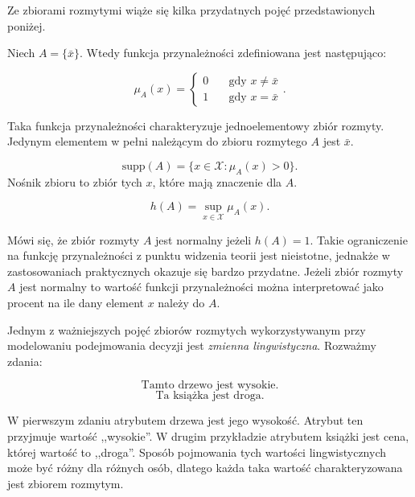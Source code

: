 Ze zbiorami rozmytymi wiąże się kilka przydatnych pojęć przedstawionych poniżej.

\begin{definition}[Singleton]
Niech $A = \{ \bar{x} \}$. Wtedy funkcja przynależności zdefiniowana jest
następująco:

\begin{equation}
\mu_A(x) = 
\left\{ 
	\begin{array}{ll}
	  0 & \quad \textrm{gdy } x \neq \bar{x} \\
      1 & \quad \textrm{gdy } x = \bar{x}
  	\end{array} 
  \right..
\end{equation}

Taka funkcja przynależności charakteryzuje jednoelementowy zbiór rozmyty.
Jedynym elementem w pełni należącym do zbioru rozmytego $A$ jest $\bar{x}$.
\end{definition}

\begin{definition}
\begin{equation}
  \mathrm{supp}(A) = \{ x \in \mathcal{X} : \mu_A(x) > 0 \}.
\end{equation}
Nośnik zbioru to zbiór tych $x$, które mają znaczenie dla $A$.  
\end{definition}

\begin{definition}
\begin{equation}
  h(A) = \sup_{x \in \mathcal{X}} \mu_A(x).
\end{equation}
\end{definition}

Mówi się, że zbiór rozmyty $A$ jest normalny jeżeli $h(A)=1$. Takie ograniczenie
na funkcję przynależności z punktu widzenia teorii jest nieistotne, jednakże w
zastosowaniach praktycznych okazuje się bardzo przydatne. Jeżeli zbiór rozmyty
$A$ jest normalny to wartość funkcji przynależności można interpretować jako
procent na ile dany element $x$ należy do $A$.

Jednym z ważniejszych pojęć zbiorów rozmytych wykorzystywanym przy modelowaniu
podejmowania decyzji jest \emph{zmienna lingwistyczna}. Rozważmy zdania:

$$\text{Tamto drzewo jest wysokie.}$$
$$\text{Ta książka jest droga.}$$

W pierwszym zdaniu atrybutem drzewa jest jego wysokość. Atrybut ten przyjmuje
wartość ,,wysokie''. W drugim przykładzie atrybutem książki jest cena, której
wartość to ,,droga''. Sposób pojmowania tych wartości lingwistycznych może być
różny dla różnych osób, dlatego każda taka wartość charakteryzowana jest zbiorem
rozmytym.

